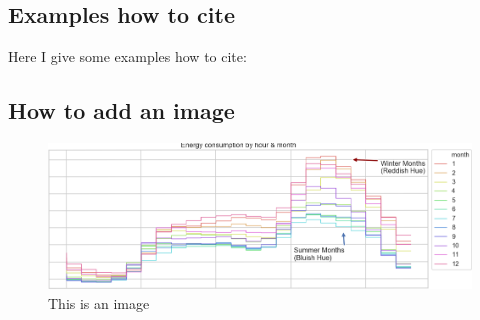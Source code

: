 \subsection*{Examples how to cite}

Here I give some examples how to cite:
\cite{moore_campylobacter_2005}
\parencite{moore_campylobacter_2005} 
\textcite{moore_campylobacter_2005}
\citeauthor{moore_campylobacter_2005}

\subsection*{How to add an image}

\begin{figure}[!ht]
	\centering
	\includegraphics[width=\textwidth]{images/testimage1}
	\caption{This is an image}
	\label{fig:testimage1}
\end{figure}

